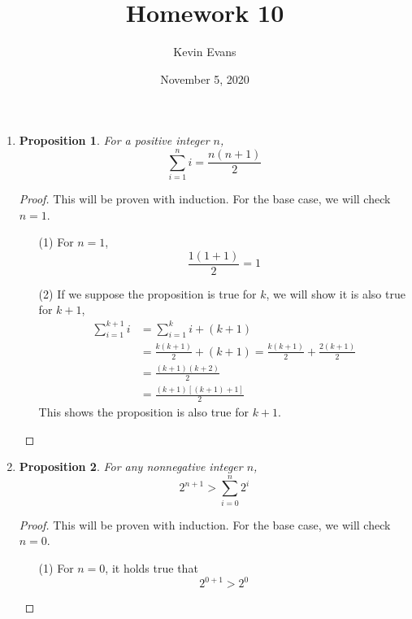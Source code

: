 \documentclass{homework}
\title{Homework 10}
\author{Kevin Evans}
\date{November 5, 2020}
\newtheorem*{prop}{Proposition}
\begin{document}
	\maketitle
	
	\begin{enumerate}
		\item \begin{minipage}[t]{\linewidth}
			\begin{prop}
			For a positive integer $n$,
				\[\sum_{i = 1}^n i = \frac{n(n+1)}{2}\]
			\end{prop}
			\begin{proof} This will be proven with induction. For the base case, we will check $n=1$. \begin{enumerate}
					\item[(1)] For $n=1$, $$ \frac{1(1+1)}{2} = 1$$
					\item[(2)] If we suppose the proposition is true for $k$, we will show it is also true for $k+1$, \begin{align*}
						\sum_{i=1}^{k + 1} i & = \sum_{i=1}^k i + (k+1) \\
							& = \frac{ k(k+1) }{2} + (k+1) = \frac{ k(k+1) }{2} + \frac{2(k+1)}{2} \\
							& = \frac{(k+1)(k+2)}{2} \\
							& = \frac{(k+1)\left[(k+1) + 1\right]}{2}
					\end{align*}
					This shows the proposition is also true for $k+1$.
				\end{enumerate}
			\end{proof}
		\end{minipage}
	
		\item  \begin{minipage}[t]{\linewidth}
			\begin{prop}
				For any nonnegative integer $n$,
				\[ 2^{n+1} > \sum_{i=0}^n 2^i\]
			\end{prop}
			\begin{proof} This will be proven with induction. For the base case, we will check $n=0$. \begin{enumerate}
					\item[(1)] For $n=0$, it holds true that \[2^{0+1} > 2^0\]
					

\end{enumerate}
\end{proof}
\end{minipage}
\end{enumerate}
\end{document}
